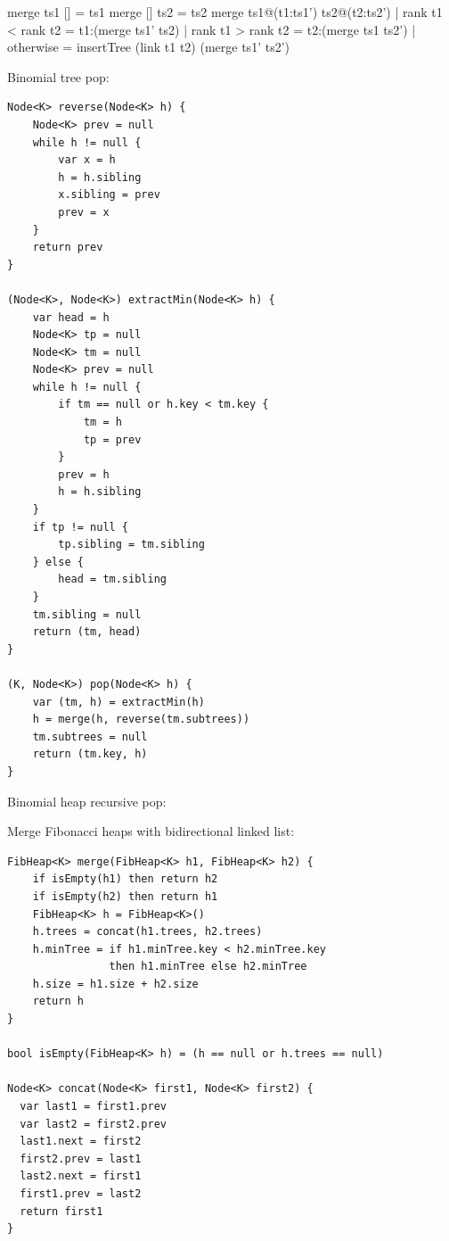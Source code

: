 \documentclass[b5paper]{article}
\begin{document}
\begin{Haskell}
merge ts1 [] = ts1
merge [] ts2 = ts2
merge ts1@(t1:ts1') ts2@(t2:ts2')
    | rank t1 < rank t2 = t1:(merge ts1' ts2)
    | rank t1 > rank t2 = t2:(merge ts1 ts2')
    | otherwise = insertTree (link t1 t2) (merge ts1' ts2')
\end{Haskell}

Binomial tree pop:

\begin{lstlisting}[language = Bourbaki]
Node<K> reverse(Node<K> h) {
    Node<K> prev = null
    while h != null {
        var x = h
        h = h.sibling
        x.sibling = prev
        prev = x
    }
    return prev
}

(Node<K>, Node<K>) extractMin(Node<K> h) {
    var head = h
    Node<K> tp = null
    Node<K> tm = null
    Node<K> prev = null
    while h != null {
        if tm == null or h.key < tm.key {
            tm = h
            tp = prev
        }
        prev = h
        h = h.sibling
    }
    if tp != null {
        tp.sibling = tm.sibling
    } else {
        head = tm.sibling
    }
    tm.sibling = null
    return (tm, head)
}

(K, Node<K>) pop(Node<K> h) {
    var (tm, h) = extractMin(h)
    h = merge(h, reverse(tm.subtrees))
    tm.subtrees = null
    return (tm.key, h)
}
\end{lstlisting}

Binomial heap recursive pop:


Merge Fibonacci heaps with bidirectional linked list:

\begin{lstlisting}[language = Bourbaki]
FibHeap<K> merge(FibHeap<K> h1, FibHeap<K> h2) {
    if isEmpty(h1) then return h2
    if isEmpty(h2) then return h1
    FibHeap<K> h = FibHeap<K>()
    h.trees = concat(h1.trees, h2.trees)
    h.minTree = if h1.minTree.key < h2.minTree.key
                then h1.minTree else h2.minTree
    h.size = h1.size + h2.size
    return h
}

bool isEmpty(FibHeap<K> h) = (h == null or h.trees == null)

Node<K> concat(Node<K> first1, Node<K> first2) {
  var last1 = first1.prev
  var last2 = first2.prev
  last1.next = first2
  first2.prev = last1
  last2.next = first1
  first1.prev = last2
  return first1
}
\end{lstlisting}
\end{document}
